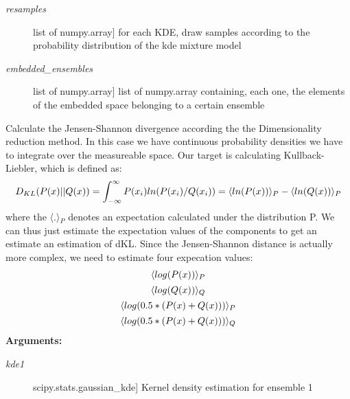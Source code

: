 \documentclass[letterpaper,10pt,english]{sphinxmanual}
\begin{document}
\begin{fulllineitems}
\begin{description}
\item[{\emph{resamples}}] \leavevmode{[}list of numpy.array{]}
for each KDE, draw samples according to the probability distribution of the kde mixture model

\item[{\emph{embedded\_ensembles}}] \leavevmode{[}list of numpy.array{]}
list of numpy.array containing, each one, the elements of the embedded space belonging to a certain ensemble

\end{description}

\end{fulllineitems}


\begin{fulllineitems}
\label{index:encore.similarity.dimred_ensemble_similarity}
Calculate the Jensen-Shannon divergence according the the Dimensionality reduction method. In this case we have continuous probability densities we have to integrate over the measureable space. Our target is calculating Kullback-Liebler, which is defined as:
\begin{gather}
\begin{split}D_{KL}(P(x) || Q(x)) = \int_{-\infty}^{\infty}P(x_i) ln(P(x_i)/Q(x_i)) = \langle{}ln(P(x))\rangle{}_P - \langle{}ln(Q(x))\rangle{}_P\end{split}\notag
\end{gather}
where the \(\langle{}.\rangle{}_P\) denotes an expectation calculated under the 
distribution P. We can thus just estimate the expectation values of the components to get an estimate an estimation of dKL.
Since the Jensen-Shannon distance is actually  more complex, we need to estimate four expecation values:
\begin{gather}
\begin{split}\langle{}log(P(x))\rangle{}_P\end{split}\notag\\\begin{split}\langle{}log(Q(x))\rangle{}_Q\end{split}\notag\\\begin{split}\langle{}log(0.5*(P(x)+Q(x)))\rangle{}_P\end{split}\notag\\\begin{split}\langle{}log(0.5*(P(x)+Q(x)))\rangle{}_Q\end{split}\notag
\end{gather}
\textbf{Arguments:}
\begin{description}
\item[{\emph{kde1}}] \leavevmode{[}scipy.stats.gaussian\_kde{]}
Kernel density estimation for ensemble 1


\end{description}
\end{fulllineitems}
\end{document}
